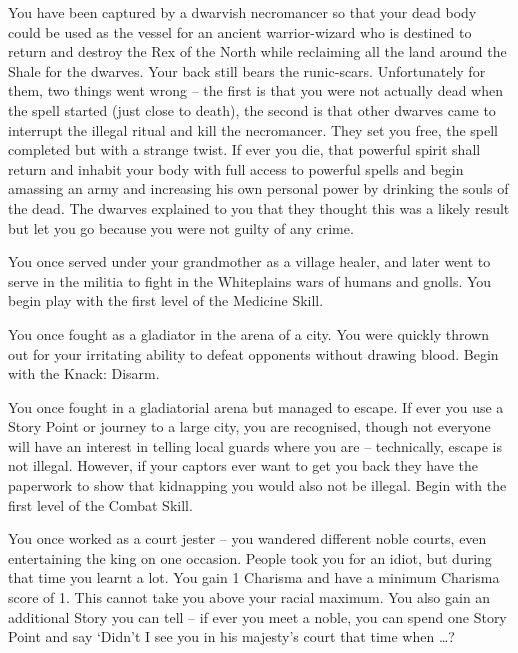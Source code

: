 \begin{multicols}{2}
\begin{list}{\addtocounter{list}{1}\textbf{:}}{\raggedleft}
	\item
	You have been captured by a dwarvish necromancer so that your dead body could be used as the vessel for an ancient warrior-wizard who is destined to return and destroy the Rex of the North while reclaiming all the land around the Shale for the dwarves.
	Your back still bears the runic-scars.
	Unfortunately for them, two things went wrong -- the first is that you were not actually dead when the spell started (just close to death), the second is that other dwarves came to interrupt the illegal ritual and kill the necromancer.
	They set you free, the spell completed but with a strange twist.
	If ever you die, that powerful spirit shall return and inhabit your body with full access to powerful spells and begin amassing an army and increasing his own personal power by drinking the souls of the dead.
	The dwarves explained to you that they thought this was a likely result but let you go because you were not guilty of any crime.

	\item
	You once served under your grandmother as a village healer, and later went to serve in the militia to fight in the Whiteplains wars of humans and gnolls.
You begin play with the first level of the Medicine Skill. 

	\item
	You once fought as a gladiator in the arena of a city.
	You were quickly thrown out for your irritating ability to defeat opponents without drawing blood.
	Begin with the Knack: Disarm.

	\item
	You once fought in a gladiatorial arena but managed to escape.
	If ever you use a Story Point or journey to a large city, you are recognised, though not everyone will have an interest in telling local guards where you are -- technically, escape is not illegal.
	However, if your captors ever want to get you back they have the paperwork to show that kidnapping you would also not be illegal.
	Begin with the first level of the Combat Skill. 

	\item
	You once worked as a court jester -- you wandered different noble courts, even entertaining the king on one occasion.
	People took you for an idiot, but during that time you learnt a lot.
	You gain 1 Charisma and have a minimum Charisma score of 1.
	This cannot take you above your racial maximum.
	You also gain an additional Story you can tell -- if ever you meet a noble, you can spend one Story Point and say `Didn't I see you in his majesty's court that time when \ldots ?


\end{list}
\end{multicols}
